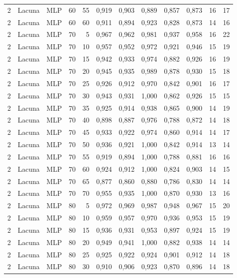 \begin{longtable}{@{}rllrrrrrrrrr@{}}
2 & Lacuna & MLP & 60 & 55 & 0,919 & 0,903 & 0,889 & 0,857 & 0,873 & 16 & 17 \\
2 & Lacuna & MLP & 60 & 60 & 0,911 & 0,894 & 0,923 & 0,828 & 0,873 & 14 & 16 \\
2 & Lacuna & MLP & 70 & 5 & 0,967 & 0,962 & 0,981 & 0,937 & 0,958 & 16 & 22 \\
2 & Lacuna & MLP & 70 & 10 & 0,957 & 0,952 & 0,972 & 0,921 & 0,946 & 15 & 19 \\
2 & Lacuna & MLP & 70 & 15 & 0,942 & 0,933 & 0,974 & 0,882 & 0,926 & 16 & 19 \\
2 & Lacuna & MLP & 70 & 20 & 0,945 & 0,935 & 0,989 & 0,878 & 0,930 & 15 & 18 \\
2 & Lacuna & MLP & 70 & 25 & 0,926 & 0,912 & 0,970 & 0,842 & 0,901 & 16 & 17 \\
2 & Lacuna & MLP & 70 & 30 & 0,943 & 0,931 & 1,000 & 0,862 & 0,926 & 15 & 15 \\
2 & Lacuna & MLP & 70 & 35 & 0,925 & 0,914 & 0,938 & 0,865 & 0,900 & 14 & 19 \\
2 & Lacuna & MLP & 70 & 40 & 0,898 & 0,887 & 0,976 & 0,788 & 0,872 & 14 & 18 \\
2 & Lacuna & MLP & 70 & 45 & 0,933 & 0,922 & 0,974 & 0,860 & 0,914 & 14 & 17 \\
2 & Lacuna & MLP & 70 & 50 & 0,936 & 0,921 & 1,000 & 0,842 & 0,914 & 13 & 14 \\
2 & Lacuna & MLP & 70 & 55 & 0,919 & 0,894 & 1,000 & 0,788 & 0,881 & 16 & 16 \\
2 & Lacuna & MLP & 70 & 60 & 0,924 & 0,912 & 1,000 & 0,824 & 0,903 & 14 & 15 \\
2 & Lacuna & MLP & 70 & 65 & 0,877 & 0,860 & 0,880 & 0,786 & 0,830 & 14 & 14 \\
2 & Lacuna & MLP & 70 & 70 & 0,955 & 0,935 & 1,000 & 0,870 & 0,930 & 13 & 16 \\
2 & Lacuna & MLP & 80 & 5 & 0,972 & 0,969 & 0,987 & 0,948 & 0,967 & 15 & 20 \\
2 & Lacuna & MLP & 80 & 10 & 0,959 & 0,957 & 0,970 & 0,936 & 0,953 & 15 & 19 \\
2 & Lacuna & MLP & 80 & 15 & 0,936 & 0,931 & 0,953 & 0,897 & 0,924 & 15 & 19 \\
2 & Lacuna & MLP & 80 & 20 & 0,949 & 0,941 & 1,000 & 0,882 & 0,938 & 14 & 14 \\
2 & Lacuna & MLP & 80 & 25 & 0,925 & 0,922 & 0,924 & 0,901 & 0,912 & 14 & 18 \\
2 & Lacuna & MLP & 80 & 30 & 0,910 & 0,906 & 0,923 & 0,870 & 0,896 & 14 & 18 \\

\end{longtable}
